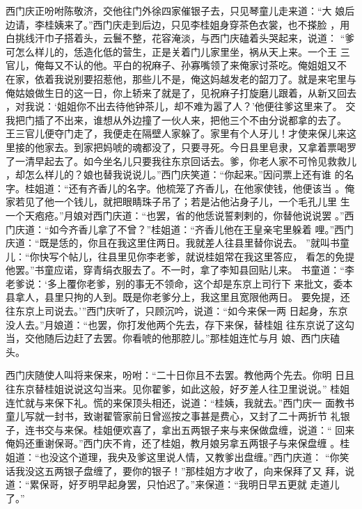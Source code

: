西门庆正吩咐陈敬济，交他往门外徐四家催银子去，只见琴童儿走来道：“大
娘后边请，李桂姨来了。”西门庆走到后边，只见李桂姐身穿茶色衣裳，也不搽脸
，用白挑线汗巾子搭着头，云鬟不整，花容淹淡，与西门庆磕着头哭起来，说道：
“爹可怎么样儿的，恁造化低的营生，正是关着门儿家里坐，祸从天上来。一个王
三官儿，俺每又不认的他。平白的祝麻子、孙寡嘴领了来俺家讨茶吃。俺姐姐又不
在家，依着我说别要招惹他，那些儿不是，俺这妈越发老的韶刀了。就是来宅里与
俺姑娘做生日的这一日，你上轿来了就是了，见祝麻子打旋磨儿跟着，从新又回去
，对我说：‘姐姐你不出去待他钟茶儿，却不难为嚣了人？’他便往爹这里来了。
交我把门插了不出来，谁想从外边撞了一伙人来，把他三个不由分说都拿的去了。
王三官儿便夺门走了，我便走在隔壁人家躲了。家里有个人牙儿！才使来保儿来这
里接的他家去。到家把妈唬的魂都没了，只要寻死。今日县里皂隶，又拿着票喝罗
了一清早起去了。如今坐名儿只要我往东京回话去。爹，你老人家不可怜见救救儿
，却怎么样儿的？娘也替我说说儿。”西门庆笑道：“你起来。”因问票上还有谁
的名字。桂姐道：“还有齐香儿的名字。他梳笼了齐香儿，在他家使钱，他便该当
。俺家若见了他一个钱儿，就把眼睛珠子吊了；若是沾他沾身子儿，一个毛孔儿里
生一个天疱疮。”月娘对西门庆道：“也罢，省的他恁说誓剌剌的，你替他说说罢
。”西门庆道：“如今齐香儿拿了不曾？”桂姐道：“齐香儿他在王皇亲宅里躲着
哩。”西门庆道：“既是恁的，你且在我这里住两日。我就差人往县里替你说去。
”就叫书童儿：“你快写个帖儿，往县里见你李老爹，就说桂姐常在我这里答应，
看怎的免提他罢。”书童应诺，穿青绢衣服去了。不一时，拿了李知县回贴儿来。
书童道：“李老爹说：‘多上覆你老爹，别的事无不领命，这个却是东京上司行下
来批文，委本县拿人，县里只拘的人到。既是你老爹分上，我这里且宽限他两日。
要免提，还往东京上司说去。’”西门庆听了，只顾沉吟，说道：“如今来保一两
日起身，东京没人去。”月娘道：“也罢，你打发他两个先去，存下来保，替桂姐
往东京说了这勾当，交他随后边赶了去罢。你看唬的他那腔儿。”那桂姐连忙与月
娘、西门庆磕头。

西门庆随使人叫将来保来，吩咐：“二十日你且不去罢。教他两个先去。你明
日且往东京替桂姐说说这勾当来。见你翟爹，如此这般，好歹差人往卫里说说。”
桂姐连忙就与来保下礼。慌的来保顶头相还，说道：“桂姨，我就去。”西门庆一
面教书童儿写就一封书，致谢翟管家前日曾巡按之事甚是费心，又封了二十两折节
礼银子，连书交与来保。桂姐便欢喜了，拿出五两银子来与来保做盘缠，说道：“
回来俺妈还重谢保哥。”西门庆不肯，还了桂姐，教月娘另拿五两银子与来保盘缠
。桂姐道：“也没这个道理，我央及爹这里说人情，又教爹出盘缠。”西门庆道：
“你笑话我没这五两银子盘缠了，要你的银子！”那桂姐方才收了，向来保拜了又
拜，说道：“累保哥，好歹明早起身罢，只怕迟了。”来保道：“我明日早五更就
走道儿了。”

